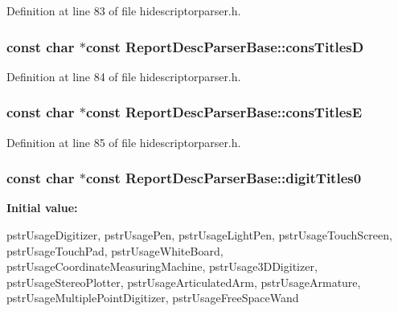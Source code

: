 \-Definition at line 83 of file hidescriptorparser.\-h.

\hypertarget{class_report_desc_parser_base_a4db83eb7ee2c16ff29da2c09dbf182f3}{
\subsubsection[{cons\-Titles\-D}]{\setlength{\rightskip}{0pt plus 5cm}const char $\ast$const {\bf \-Report\-Desc\-Parser\-Base\-::cons\-Titles\-D}}}\label{class_report_desc_parser_base_a4db83eb7ee2c16ff29da2c09dbf182f3}


\-Definition at line 84 of file hidescriptorparser.\-h.

\hypertarget{class_report_desc_parser_base_a46332dbba5ab524aedb370684510c990}{
\subsubsection[{cons\-Titles\-E}]{\setlength{\rightskip}{0pt plus 5cm}const char $\ast$const {\bf \-Report\-Desc\-Parser\-Base\-::cons\-Titles\-E}}}\label{class_report_desc_parser_base_a46332dbba5ab524aedb370684510c990}


\-Definition at line 85 of file hidescriptorparser.\-h.

\hypertarget{class_report_desc_parser_base_a298396c59609fab20c2a5eedb3ca0b87}{
\subsubsection[{digit\-Titles0}]{\setlength{\rightskip}{0pt plus 5cm}const char $\ast$const {\bf \-Report\-Desc\-Parser\-Base\-::digit\-Titles0}}}\label{class_report_desc_parser_base_a298396c59609fab20c2a5eedb3ca0b87}
{\bfseries \-Initial value\-:}
\begin{DoxyCode}
 {
        pstrUsageDigitizer,
        pstrUsagePen,
        pstrUsageLightPen,
        pstrUsageTouchScreen,
        pstrUsageTouchPad,
        pstrUsageWhiteBoard,
        pstrUsageCoordinateMeasuringMachine,
        pstrUsage3DDigitizer,
        pstrUsageStereoPlotter,
        pstrUsageArticulatedArm,
        pstrUsageArmature,
        pstrUsageMultiplePointDigitizer,
        pstrUsageFreeSpaceWand
}
\end{DoxyCode}


